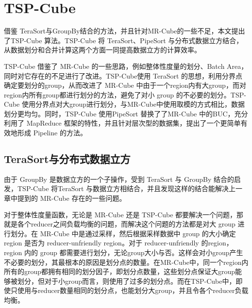 \section{TSP-Cube}

借鉴 TeraSort与GroupBy结合的方法，并且针对MR-Cube的一些不足，本文提出了TSP-Cube 算法。TSP-Cube 将 TeraSort、PipeSort 与分布式数据立方结合，从数据划分和合并计算这两个方面一同提高数据立方的计算效率。

TSP-Cube 借鉴了 MR-Cube 的一些思路，例如整体性度量的划分、Batch Area，同时对它存在的不足进行了改进。TSP-Cube使用 TeraSort 的思想，利用分界点确定要划分的group，从而改进了 MR-Cube 中由于一个region内有大group，而对region内所有group都进行划分的方法，避免了对小 group 的不必要的划分。TSP-Cube 使用分界点对大group进行划分，与MR-Cube中使用取模的方式相比，数据划分更均匀。同时，TSP-Cube 使用PipeSort 替换了了MR-Cube 中的BUC，充分利用了 MapReduce 框架的特性，并且针对层次型的数据集，提出了一个更简单有效地形成 Pipeline 的方法。

\subsection{TeraSort与分布式数据立方}


由于 GroupBy 是数据立方的一个子操作，受到 TeraSort 与 GroupBy 结合的启发，TSP-Cube 将TeraSort 与数据立方相结合，并且发现这样的结合能解决上一章中提到的 MR-Cube 存在的一些问题。



对于整体性度量函数，无论是 MR-Cube 还是 TSP-Cube 都要解决一个问题，那就是各个reducer之间负载均衡的问题，而解决这个问题的方法都是对大 group 进行划分。在 MR-Cube 中是通过采样，然后根据采样数据中 group 的大小确定 region 是否为 reducer-unfriendly region。对于 reducer-unfriendly 的region，region 内的 group 都需要进行划分，无论group大小与否。这样会对小group产生不必要的划分，其最根本的原因是划分点的数量。在MR-Cube中，同一个region内所有的group都拥有相同的划分因子，即划分点数量，这些划分点保证大group能够被划分，但对于小group而言，则使用了过多的划分点。而在TSP-Cube中，即使只使用与reducer数量相同的划分点，也能划分大group，并且令各个reducer负载均衡。

